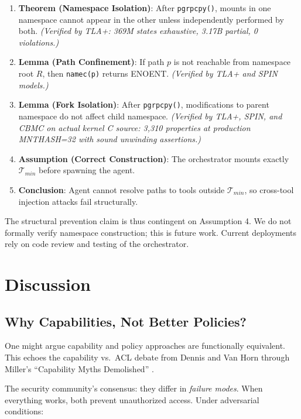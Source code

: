 \documentclass[acmsmall,screen,review]{acmart}
\begin{document}
\begin{enumerate}
    \item \textbf{Theorem (Namespace Isolation)}: After \texttt{pgrpcpy()}, mounts in
    one namespace cannot appear in the other unless independently performed by both.
    \textit{(Verified by TLA+: 369M states exhaustive, 3.17B partial, 0 violations.)}
    \item \textbf{Lemma (Path Confinement)}: If path $p$ is not reachable from
    namespace root $R$, then \texttt{namec(p)} returns ENOENT.
    \textit{(Verified by TLA+ and SPIN models.)}
    \item \textbf{Lemma (Fork Isolation)}: After \texttt{pgrpcpy()}, modifications to
    parent namespace do not affect child namespace.
    \textit{(Verified by TLA+, SPIN, and CBMC on actual kernel C source: 3,310
    properties at production MNTHASH=32 with sound unwinding assertions.)}
    \item \textbf{Assumption (Correct Construction)}: The orchestrator mounts exactly
    $\mathcal{T}_{min}$ before spawning the agent.
    \item \textbf{Conclusion}: Agent cannot resolve paths to tools outside
    $\mathcal{T}_{min}$, so cross-tool injection attacks fail structurally.
\end{enumerate}

The structural prevention claim is thus contingent on Assumption 4. We do not
formally verify namespace construction; this is future work. Current deployments
rely on code review and testing of the orchestrator.

\section{Discussion}
\label{sec:discussion}

\subsection{Why Capabilities, Not Better Policies?}

One might argue capability and policy approaches are functionally equivalent. This echoes the capability vs.\ ACL debate from Dennis and Van Horn \cite{dennis1966capabilities} through Miller's ``Capability Myths Demolished'' \cite{miller2006capability}.

The security community's consensus: they differ in \textit{failure modes}. When everything works, both prevent unauthorized access. Under adversarial conditions:
\end{document}
